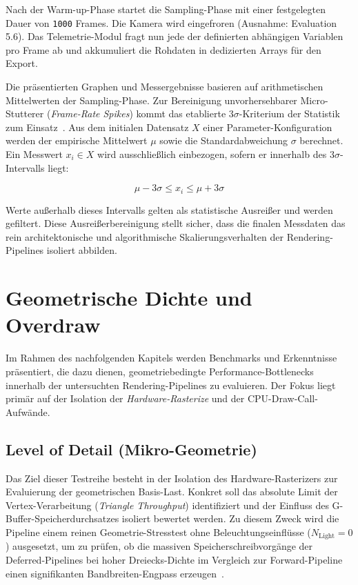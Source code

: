 Nach der Warm-up-Phase startet die Sampling-Phase mit einer festgelegten Dauer von \texttt{1000} Frames.
Die Kamera wird eingefroren (Ausnahme: Evaluation 5.6).
Das Telemetrie-Modul fragt nun jede der definierten abhängigen Variablen pro Frame ab und akkumuliert die Rohdaten in
dedizierten Arrays für den Export.

Die präsentierten Graphen und Messergebnisse basieren auf arithmetischen Mittelwerten der Sampling-Phase.
Zur Bereinigung unvorhersehbarer Micro-Stutterer (\textit{Frame-Rate Spikes}) kommt das etablierte
$3\sigma$-Kriterium der Statistik zum Einsatz~\parencite[vgl.][]{pukelsheimThreeSigmaRule1994}.
Aus dem initialen Datensatz $X$ einer Parameter-Konfiguration werden der empirische Mittelwert $\mu$ sowie die
Standardabweichung $\sigma$ berechnet.
Ein Messwert $x_i \in X$ wird ausschließlich einbezogen, sofern er innerhalb des $3\sigma$-Intervalls liegt:

\begin{equation}
    \mu - 3\sigma \le x_i \le \mu + 3\sigma
\end{equation}

Werte außerhalb dieses Intervalls gelten als statistische Ausreißer und werden gefiltert.
Diese Ausreißerbereinigung stellt sicher, dass die finalen Messdaten das rein architektonische und algorithmische
Skalierungsverhalten der Rendering-Pipelines isoliert abbilden.


\section{{Geometrische Dichte und Overdraw}}
\label{sec:0502_geometry_eval}

Im Rahmen des nachfolgenden Kapitels werden Benchmarks und Erkenntnisse präsentiert, die dazu dienen, geometriebedingte
Performance-Bottlenecks innerhalb der untersuchten Rendering-Pipelines zu evaluieren.
Der Fokus liegt primär auf der Isolation der \textit{Hardware-Rasterize} und der \ac{CPU}-Draw-Call-Aufwände.

\subsection{{Level of Detail (Mikro-Geometrie)}}
\label{subsec:050201_lod_eval}

Das Ziel dieser Testreihe besteht in der Isolation des Hardware-Rasterizers zur Evaluierung der geometrischen Basis-Last.
Konkret soll das absolute Limit der Vertex-Verarbeitung (\textit{Triangle Throughput}) identifiziert und der Einfluss des
\ac{G-Buffer}-Speicherdurchsatzes isoliert bewertet werden.
Zu diesem Zweck wird die Pipeline einem reinen Geometrie-Stresstest ohne Beleuchtungseinflüsse ($N_{\text{Light}} = 0$)
ausgesetzt, um zu prüfen, ob die massiven Speicherschreibvorgänge der Deferred-Pipelines bei hoher Dreiecks-Dichte im
Vergleich zur Forward-Pipeline einen signifikanten Bandbreiten-Engpass
erzeugen~\parencite[vgl.][S.~55]{burnsVisibilityBufferCacheFriendly2013}.

